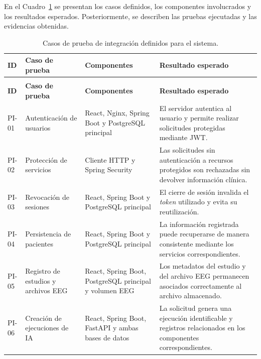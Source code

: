 En el Cuadro~\ref{tab:casos_pruebas_integracion} se presentan los casos definidos, los componentes involucrados y los resultados esperados. Posteriormente, se describen las pruebas ejecutadas y las evidencias obtenidas.


\begin{longtable}{|
>{\raggedright\arraybackslash}p{1.1cm}|
>{\raggedright\arraybackslash}p{3.5cm}|
>{\raggedright\arraybackslash}p{3.5cm}|
>{\raggedright\arraybackslash}p{5.0cm}|}
\caption{Casos de prueba de integración definidos para el sistema.}
\label{tab:casos_pruebas_integracion}\\
\hline
\textbf{ID} &
\textbf{Caso de prueba} &
\textbf{Componentes} &
\textbf{Resultado esperado} \\
\hline
\endfirsthead

\multicolumn{4}{c}{\textit{Continuación del Cuadro~\thetable}}\\
\hline
\textbf{ID} &
\textbf{Caso de prueba} &
\textbf{Componentes} &
\textbf{Resultado esperado} \\
\hline
\endhead

PI-01 &
Autenticación de usuarios &
React, Nginx, Spring Boot y PostgreSQL principal &
El servidor autentica al usuario y permite realizar solicitudes protegidas mediante JWT. \\
\hline

PI-02 &
Protección de servicios &
Cliente HTTP y Spring Security &
Las solicitudes sin autenticación a recursos protegidos son rechazadas sin devolver información clínica. \\
\hline

PI-03 &
Revocación de sesiones &
React, Spring Boot y PostgreSQL principal &
El cierre de sesión invalida el \textit{token} utilizado y evita su reutilización. \\
\hline

PI-04 &
Persistencia de pacientes &
React, Spring Boot y PostgreSQL principal &
La información registrada puede recuperarse de manera consistente mediante los servicios correspondientes. \\
\hline

PI-05 &
Registro de estudios y archivos EEG &
React, Spring Boot, PostgreSQL principal y volumen EEG &
Los metadatos del estudio y del archivo EEG permanecen asociados correctamente al archivo almacenado. \\
\hline

PI-06 &
Creación de ejecuciones de IA &
React, Spring Boot, FastAPI y ambas bases de datos &
La solicitud genera una ejecución identificable y registros relacionados en los componentes correspondientes. \\
\hline


\end{longtable}
